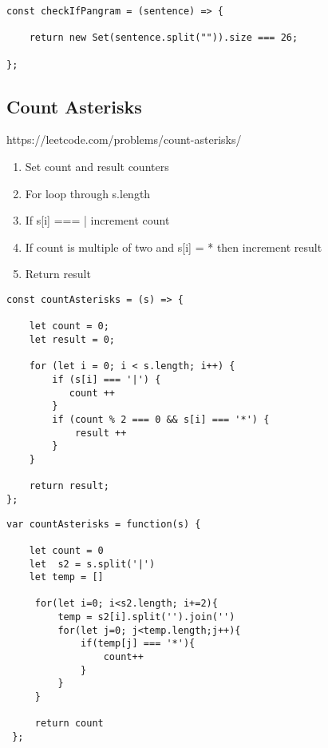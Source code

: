 \documentclass[10pt]{article}
\begin{document}
\begin{lstlisting}[title=Solution checkIfPangram, captionpos=t]
const checkIfPangram = (sentence) => {
    
    return new Set(sentence.split("")).size === 26;
    
};
\end{lstlisting}
\medskip %


\pagebreak %
\medskip 
\subsection{Count Asterisks}
https://leetcode.com/problems/count-asterisks/

\begin{enumerate}
	\item Set count and result counters
	\item For loop through s.length
	\item If s[i] === | increment count
	\item If count is multiple of two and s[i] = * then increment result
	\item Return result
\end{enumerate}

\begin{lstlisting}[title=Solution countAsterisks, captionpos=t]
const countAsterisks = (s) => {
    
    let count = 0;
    let result = 0;
    
    for (let i = 0; i < s.length; i++) {
        if (s[i] === '|') {
           count ++
        }
        if (count % 2 === 0 && s[i] === '*') {
            result ++
        }
    }
    
    return result;
};
\end{lstlisting}

\begin{lstlisting}[title=My messy solution while learning, captionpos=t]
var countAsterisks = function(s) {
    
    let count = 0
    let  s2 = s.split('|')
    let temp = []
     
     for(let i=0; i<s2.length; i+=2){
         temp = s2[i].split('').join('')
         for(let j=0; j<temp.length;j++){
             if(temp[j] === '*'){
                 count++
             }
         }
     }
     
     return count
 };
\end{lstlisting}
\medskip %
\end{document}

